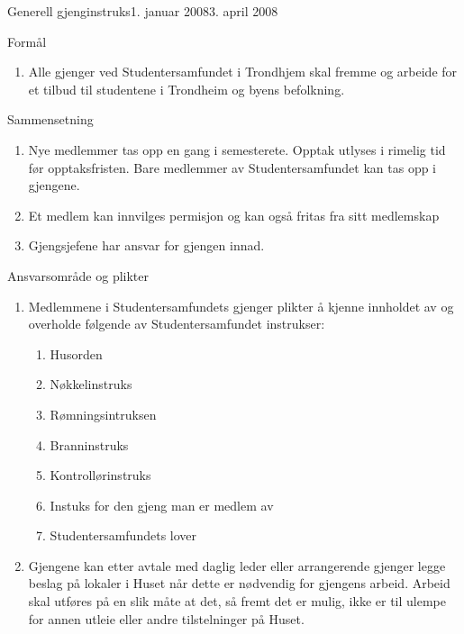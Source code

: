 \begin{instruks}{Generell gjenginstruks}{1. januar 2008}{3. april 2008}
    
    \begin{instruksledd}{Formål}
        \begin{enumerate}
            \item Alle gjenger ved Studentersamfundet i Trondhjem skal fremme og arbeide for et
                  tilbud til studentene i Trondheim og byens befolkning.
        \end{enumerate}
    \end{instruksledd}


    \begin{instruksledd}{Sammensetning}
        \begin{enumerate}
            \item Nye medlemmer tas opp en gang i semesterete. Opptak utlyses i rimelig
                tid før opptaksfristen. Bare medlemmer av Studentersamfundet kan tas opp i
                gjengene.
            \item Et medlem kan innvilges permisjon og kan også fritas fra sitt medlemskap
            \item Gjengsjefene har ansvar for gjengen innad.
        \end{enumerate}

    \end{instruksledd}


    \begin{instruksledd}{Ansvarsområde og plikter}
        \begin{enumerate}
            \item Medlemmene i Studentersamfundets gjenger plikter å kjenne innholdet av
                og overholde følgende av Studentersamfundet instrukser:
                \begin{enumerate}
                    \item Husorden
                    \item Nøkkelinstruks
                    \item Rømningsintruksen
                    \item Branninstruks
                    \item Kontrollørinstruks
                    \item Instuks for den gjeng man er medlem av
                    \item Studentersamfundets lover
                \end{enumerate}
            \item Gjengene kan etter avtale med daglig leder eller arrangerende gjenger
                legge beslag på lokaler i Huset når dette er nødvendig for gjengens
                arbeid. Arbeid skal utføres på en slik måte at det, så fremt det er mulig,
                ikke er til ulempe for annen utleie eller andre tilstelninger på Huset.
        \end{enumerate}


\end{instruksledd}
\end{instruks}
